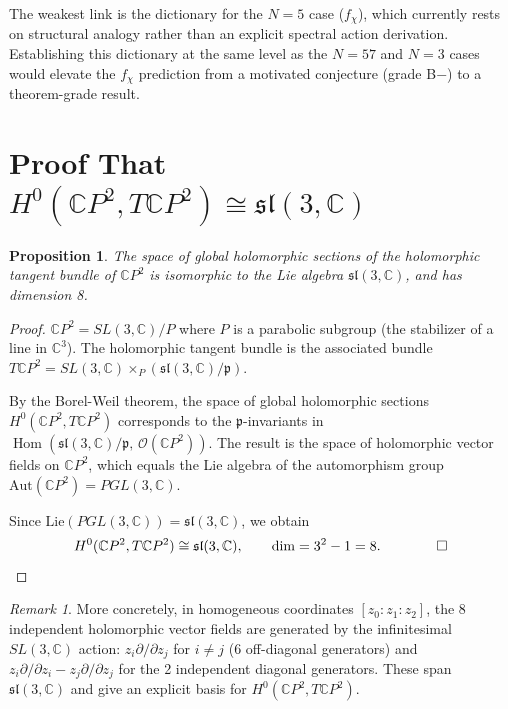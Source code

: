 \documentclass[11pt]{article}
\newtheorem{proposition}[theorem]{Proposition}
\theoremstyle{definition}
\theoremstyle{remark}
\newtheorem*{remark}{Remark}
\newcommand{\CP}{\mathbb{C}P}
\newcommand{\Hom}{\operatorname{Hom}}
\begin{document}
The weakest link is the dictionary for the $N = 5$ case ($f_\chi$),
which currently rests on structural analogy rather than an explicit
spectral action derivation. Establishing this dictionary at the same
level as the $N = 57$ and $N = 3$ cases would elevate the $f_\chi$
prediction from a motivated conjecture (grade B$-$) to a theorem-grade
result.


\appendix
\section{Proof That $H^0(\CP^2, T\CP^2) \cong \mathfrak{sl}(3,\mathbb{C})$}
\label{app:TCP2}

\begin{proposition}
The space of global holomorphic sections of the holomorphic tangent
bundle of $\CP^2$ is isomorphic to the Lie algebra
$\mathfrak{sl}(3,\mathbb{C})$, and has dimension 8.
\end{proposition}

\begin{proof}
$\CP^2 = SL(3,\mathbb{C}) / P$ where $P$ is a parabolic subgroup
(the stabilizer of a line in $\mathbb{C}^3$). The holomorphic tangent
bundle is the associated bundle $T\CP^2 = SL(3,\mathbb{C}) \times_P
(\mathfrak{sl}(3,\mathbb{C})/\mathfrak{p})$.

By the Borel-Weil theorem, the space of global holomorphic sections
$H^0(\CP^2, T\CP^2)$ corresponds to the $\mathfrak{p}$-invariants in
$\Hom(\mathfrak{sl}(3,\mathbb{C})/\mathfrak{p},\,
\mathcal{O}(\CP^2))$. The result is the space of holomorphic vector
fields on $\CP^2$, which equals the Lie algebra of the automorphism
group $\mathrm{Aut}(\CP^2) = PGL(3,\mathbb{C})$.

Since $\mathrm{Lie}(PGL(3,\mathbb{C})) = \mathfrak{sl}(3,\mathbb{C})$,
we obtain
\begin{equation}
H^0(\CP^2, T\CP^2) \cong \mathfrak{sl}(3,\mathbb{C}),
\qquad \dim = 3^2 - 1 = 8. \qquad \qed
\end{equation}
\end{proof}

\begin{remark}
More concretely, in homogeneous coordinates $[z_0:z_1:z_2]$, the 8
independent holomorphic vector fields are generated by the infinitesimal
$SL(3,\mathbb{C})$ action:
$z_i \partial/\partial z_j$ for $i \neq j$ (6 off-diagonal generators)
and $z_i \partial/\partial z_i - z_j \partial/\partial z_j$ for the 2
independent diagonal generators. These span
$\mathfrak{sl}(3,\mathbb{C})$ and give an explicit basis for
$H^0(\CP^2, T\CP^2)$.
\end{remark}
\end{document}
